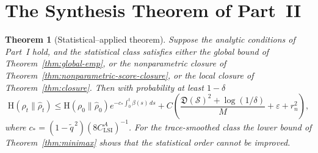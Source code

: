 \documentclass{article}
\newtheorem{theorem}{Theorem}[section]
\newcommand{\Ent}{\mathrm H}
\begin{document}
\section{The Synthesis Theorem of Part~II}

\begin{theorem}[Statistical--applied theorem]
\label{thm:part2-main}
Suppose the analytic conditions of Part~I hold, and the statistical class
satisfies either the global bound of Theorem~\ref{thm:global-emp}, or the
nonparametric closure of Theorem~\ref{thm:nonparametric-score-closure}, or the
local closure of Theorem~\ref{thm:closure}. Then with probability at least
\(1-\delta\)
\[
        \Ent(\rho_t\|\hat\rho_t)
        \le
        \Ent(\rho_0\|\hat\rho_0)
        e^{-c_*\int_0^t\beta(s)\,ds}
        +
        C\left(
        \frac{\mathfrak D(\mathcal S)^2+\log(1/\delta)}{M}
        +\varepsilon+r_n^2
        \right),
\]
where \(c_*=(1-\widetilde q^{\,2})(8C_{\mathrm{LSI}}^A)^{-1}\). For the
trace-smoothed class the lower bound of Theorem~\ref{thm:minimax} shows that the
statistical order cannot be improved.
\end{theorem}
\end{document}
